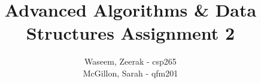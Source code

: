 \title{Advanced Algorithms \& Data Structures Assignment 2}
\author{
  Waseem, Zeerak - csp265\\
  McGillon, Sarah - qfm201
}
\maketitle

